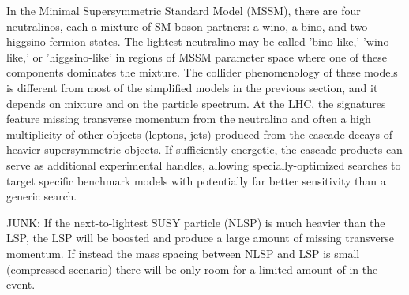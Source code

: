In the Minimal Supersymmetric Standard Model (MSSM),
there are four neutralinos, each a mixture of SM boson partners: a wino, a bino, and two higgsino fermion states.
The lightest neutralino may be called 'bino-like,' 'wino-like,' or 'higgsino-like'
in regions of MSSM parameter space where one of these components dominates the mixture.
The collider phenomenology of these models is different from most of the simplified models in the previous section, and it depends on mixture and on the particle spectrum. 
At the LHC, the signatures feature missing transverse momentum from the neutralino and often a high multiplicity of other objects
(leptons, jets) produced from the cascade decays of heavier supersymmetric objects.  
If sufficiently energetic, the cascade products can serve as additional experimental handles,
allowing specially-optimized searches to target specific benchmark models with potentially far better sensitivity than a generic search. 

JUNK: If the next-to-lightest SUSY particle (NLSP) is much heavier than the LSP, the LSP will be boosted and produce
a large amount of missing transverse momentum. If instead the mass spacing between NLSP and LSP is 
small (compressed scenario) there will be only room for a limited amount of \MET in the event.


%

